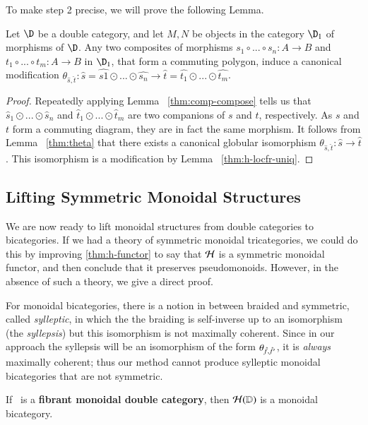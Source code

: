 \documentclass{amsart}
\begin{document}
To make step 2 precise, we will prove the following Lemma.

\begin{lem}\label{lem:modification}
Let $\D$ be a double category, and let $M,N$ be objects in the category $\D_1$ of morphisms of $\D$. Any two composites of morphisms $s_1 \circ ... \circ s_n:A \rightarrow B$ and $t_1 \circ ... \circ t_m: A \rightarrow B$ in $\D_1$, that form a commuting polygon, induce a canonical modification $\theta_{\hat{s},\hat{t}} : \hat{s} = \hat{s1} \odot ... \odot \hat{s_n} \rightarrow \hat{t} = \hat{t_1} \odot ... \odot \hat{t_m}$. 
\end{lem}

\begin{proof}
Repeatedly applying Lemma ~\ref{thm:comp-compose} tells us that $\hat{s}_1 \odot ... \odot \hat{s}_n$ and $\hat{t}_1 \odot ... \odot \hat{t}_m$ are two companions of $s$ and $t$, respectively. As $s$ and $t$ form a commuting diagram, they are in fact the same morphism. It follows from Lemma ~\ref{thm:theta} that there exists a canonical globular isomorphism $\theta_{\hat{s},\hat{t}}: \hat{s} \rightarrow \hat{t}$. This isomorphism is a modification by Lemma ~\ref{thm:h-locfr-uniq}.
\end{proof}
  

\subsection{Lifting Symmetric Monoidal Structures}
We are now ready to lift monoidal structures from double categories to
bicategories.  If we had a theory of symmetric monoidal tricategories,
we could do this by improving \autoref{thm:h-functor} to say that
$\mathcal{H}$ is a symmetric monoidal functor, and then conclude that it
preserves pseudomonoids.  However, in the absence of such a theory, we
give a direct proof.

\begin{rmk}\label{rmk:sym}
  For monoidal bicategories, there is a notion in between braided and
  symmetric, called \emph{sylleptic}, in which the the braiding is
  self-inverse up to an isomorphism (the \emph{syllepsis}) but this
  isomorphism is not maximally coherent.  Since in our approach the
  syllepsis will be an isomorphism of the form
  $\theta_{\hat{f},\hat{f}'}$, it is \emph{always} maximally coherent;
  thus our method cannot produce sylleptic monoidal bicategories that
  are not symmetric.
\end{rmk}

\begin{lem}\label{thm:mon11-monbi}
  If \lD\ is a {\bf fibrant monoidal double category}, then $\mathcal{H}(\mathbb{D})$ is a
  monoidal bicategory.  
\end{lem}
\end{document}
